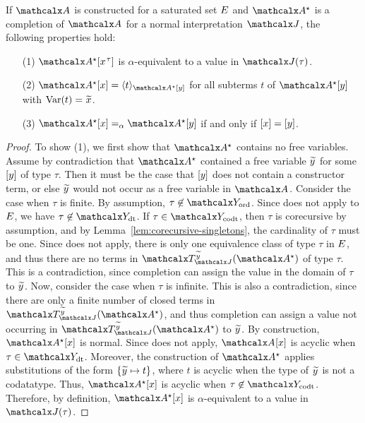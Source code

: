 \begin{lemma}
\label{lem:interpretation-completion}
If $\Val$ is constructed for a saturated set $E$
and $\ValC$ is a completion of $\Val$ for a normal interpretation $\J$, the following properties hold:
\begin{enumerate}
\item[\rm (1)] $\ValC \ec{x\typ{\tau}}$ is $\alpha$-equivalent to a value in $\interp{\J}{\tau}$.
\item[\rm (2)]
$\ValC \ec{x} = \expand{\ValC \ec{y}}{ t }$ for
all subterms $t$ of $\ValC \ec{y}$ with $\muvar(t) = {\Varec{x}}$.
\item[\rm (3)]
$\ValC \ec{x} \vsim \ValC \ec{y}$ if and only if $[x] = [y]$.
\end{enumerate}
\end{lemma}
\begin{rep}
\begin{proof}
To show (1), we first show that $\ValC$ contains no free variables.
Assume by contradiction that $\ValC$ contained a free variable ${\Varec{y}}$ for some $[y]$ of type $\tau$.
Then it must be the case that $[y]$ does not contain a constructor term,
or else ${\Varec{y}}$ would not occur as a free variable in $\Val$.
Consider the case when $\tau$ is finite.
By assumption, $\tau \not\in \Nondata$.
Since  does not apply to $E$, we have $\tau \not\in \Data$.
If $\tau \in \Codata$, then $\tau$ is corecursive by assumption, and by Lemma~\ref{lem:corecursive-singletons},
the cardinality of $\tau$ must be one.
Since  does not apply, %
there is only one equivalence class of type $\tau$ in $E$,
and thus there are no terms in $\Terms_{\smash{\J}}^{\Varec{y}}(\ValC)$ of type $\tau$.
This is a contradiction, since %
completion can assign the value in the domain of $\tau$ to ${\Varec{y}}$.
Now, consider the case when $\tau$ is infinite.
This is also a contradiction,
since there are only a finite number of closed terms in $\Terms_{\smash{\J}}^{\Varec{y}}(\ValC)$,
and thus %
completion can assign a value not occurring in $\Terms_{\smash{\J}}^{\Varec{y}}(\ValC)$ to ${\Varec{y}}$.
By construction, $\ValC \ec{x}$ is normal.
Since  does not apply, $\Val \ec{x}$ is acyclic when $\tau \in \Data$.
Moreover, the construction of $\ValC$ applies substitutions of the form
$\{ {\Varec{y}} \mapsto t \}$, where $t$ is acyclic when the type of ${\Varec{y}}$ is not a codatatype.
Thus, $\ValC \ec{x}$ is acyclic when $\tau \not\in \Codata$.
Therefore, by definition, $\ValC \ec{x}$ is $\alpha$-equivalent to a value in $\interp{\J}{\tau}$.


\end{proof}
\end{rep}
